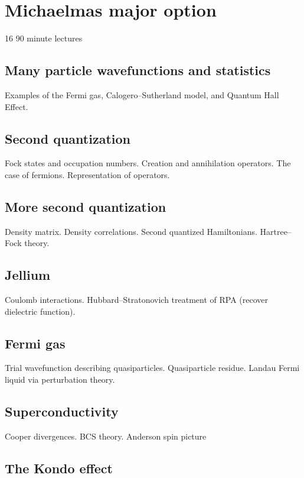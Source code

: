 \section{Michaelmas major option}

16 90 minute lectures

\subsection{Many particle wavefunctions and statistics}

Examples of the Fermi gas, Calogero--Sutherland model, and Quantum Hall Effect.

\subsection{Second quantization}

Fock states and occupation numbers. Creation and annihilation operators. The case of fermions. Representation of operators.

\subsection{More second quantization}

Density matrix. Density correlations. Second quantized Hamiltonians. Hartree--Fock theory.

\subsection{Jellium}

Coulomb interactions. Hubbard--Stratonovich treatment of RPA (recover dielectric function).

\subsection{Fermi gas}

Trial wavefunction describing quasiparticles. Quasiparticle residue. Landau Fermi liquid via perturbation theory. 

\subsection{Superconductivity}

Cooper divergences. BCS theory. Anderson spin picture

\subsection{The Kondo effect}

